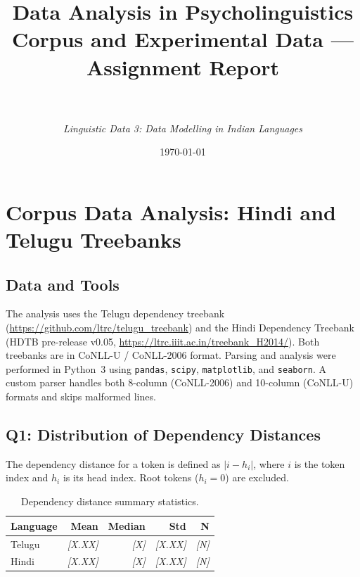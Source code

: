 \documentclass[12pt,a4paper]{article}
\title{%
  \textbf{Data Analysis in Psycholinguistics}\\[0.5em]
  \large Corpus and Experimental Data — Assignment Report
}
\author{%
  \placeholder{Your Name}\\
  \placeholder{Student ID}\\[0.4em]
  \small\textit{Linguistic Data 3: Data Modelling in Indian Languages}
}
\date{\today}
\newcommand{\placeholder}[1]{\textcolor{red!70!black}{\textit{[#1]}}}
\begin{document}
\maketitle
\tableofcontents
\newpage

\section{Corpus Data Analysis: Hindi and Telugu Treebanks}

\subsection*{Data and Tools}
The analysis uses the Telugu dependency treebank
(\url{https://github.com/ltrc/telugu_treebank}) and the Hindi Dependency
Treebank (HDTB pre-release v0.05,
\url{https://ltrc.iiit.ac.in/treebank_H2014/}).  Both treebanks are in
CoNLL-U / CoNLL-2006 format.  Parsing and analysis were performed in Python~3
using \texttt{pandas}, \texttt{scipy}, \texttt{matplotlib}, and
\texttt{seaborn}.  A custom parser handles both 8-column (CoNLL-2006) and
10-column (CoNLL-U) formats and skips malformed lines.

\subsection{Q1: Distribution of Dependency Distances}

The dependency distance for a token is defined as $|i - h_i|$, where $i$ is
the token index and $h_i$ is its head index.  Root tokens ($h_i = 0$) are
excluded.

\begin{table}[H]
\centering
\caption{Dependency distance summary statistics.}
\begin{tabular}{lrrrr}
\toprule
\textbf{Language} & \textbf{Mean} & \textbf{Median} & \textbf{Std} & \textbf{N} \\
\midrule
Telugu & \placeholder{X.XX} & \placeholder{X} & \placeholder{X.XX} & \placeholder{N} \\
Hindi  & \placeholder{X.XX} & \placeholder{X} & \placeholder{X.XX} & \placeholder{N} \\
\bottomrule
\end{tabular}
\label{tab:dist_stats}
\end{table}
\end{document}
